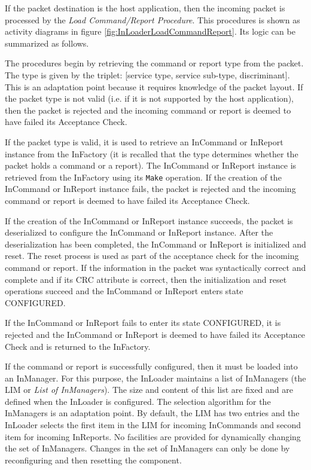If the packet destination is the host application, then the incoming packet is processed by the \textit{Load Command/Report Procedure}. This procedures is shown as activity diagrams in figure \ref{fig:InLoaderLoadCommandReport}. Its logic can be summarized as follows.

The procedures begin by retrieving the command or report type from the packet. The type is given by the triplet: [service type, service sub-type, discriminant]. This is an adaptation point because it requires knowledge of the packet layout. If the packet type is not valid (i.e. if it is not supported by the host application), then the packet is rejected and the incoming command or report is deemed to have failed its Acceptance Check.

If the packet type is valid, it is used to retrieve an InCommand or InReport instance from the InFactory (it is recalled that the type determines whether the packet holds a command or a report). The InCommand or InReport instance is retrieved from the InFactory using its \texttt{Make} operation. If the creation of the InCommand or InReport instance fails, the packet is rejected and the incoming command or report is deemed to have failed its Acceptance Check.

If the creation of the InCommand or InReport instance succeeds, the packet is deserialized to configure the InCommand or InReport instance. After the deserialization has been completed, the InCommand or InReport is initialized and reset. The reset process is used as part of the acceptance check for the incoming command or report. If the information in the packet was syntactically correct and complete and if its CRC attribute is correct, then the initialization and reset operations succeed and the InCommand or InReport enters state CONFIGURED.

If the InCommand or InReport fails to enter its state CONFIGURED, it is rejected and the InCommand or InReport is deemed to have failed its Acceptance Check and is returned to the InFactory.

If the command or report is successfully configured, then it must be loaded into an InManager. For this purpose, the InLoader maintains a list of InManagers (the LIM or \textit{List of InManagers}). The size and content of this list are fixed and are defined when the InLoader is configured. The selection algorithm for the InManagers is an adaptation point. By default, the LIM has two entries and the InLoader selects the first item in the LIM for incoming InCommands and second item for incoming InReports. 
No facilities are provided for dynamically changing the set of InManagers. Changes in the set of InManagers can only be done by reconfiguring and then resetting the component.

